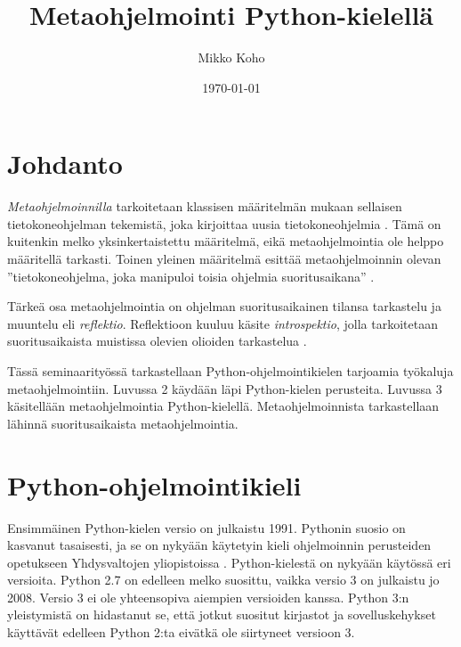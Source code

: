 \documentclass[finnish]{tktltiki2}
\title{Metaohjelmointi Python-kielellä}
\author{Mikko Koho}
\date{\today}
\theoremstyle{definition}
\theoremstyle{remark}
\begin{document}
    

\frontmatter      %

\maketitle        %

\makeabstract     %

\tableofcontents  %


\mainmatter       %


\section{Johdanto}

\emph{Metaohjelmoinnilla} tarkoitetaan klassisen määritelmän mukaan sellaisen tietokoneohjelman tekemistä, joka kirjoittaa uusia tietokoneohjelmia \cite[s. 6]{hazzard2013}. Tämä on kuitenkin melko yksinkertaistettu määritelmä, eikä metaohjelmointia ole helppo määritellä tarkasti. Toinen yleinen määritelmä esittää metaohjelmoinnin olevan ''tietokoneohjelma, joka manipuloi toisia ohjelmia suoritusaikana'' \cite[s. 7]{hazzard2013}. 

Tärkeä osa metaohjelmointia on ohjelman suoritusaikainen tilansa tarkastelu ja muuntelu eli \emph{reflektio}. Reflektioon kuuluu käsite \emph{introspektio}, jolla tarkoitetaan suoritusaikaista muistissa olevien olioiden tarkastelua \cite{dive-into-python}.

Tässä seminaarityössä tarkastellaan Python-ohjelmointikielen tarjoamia työkaluja metaohjelmointiin. Luvussa 2 käydään läpi Python-kielen perusteita. Luvussa 3 käsitellään metaohjelmointia Python-kielellä. Metaohjelmoinnista tarkastellaan lähinnä suoritusaikaista metaohjelmointia. 



\section{Python-ohjelmointikieli}

Ensimmäinen Python-kielen versio on julkaistu 1991. Pythonin suosio on kasvanut tasaisesti, ja se on nykyään käytetyin kieli ohjelmoinnin perusteiden opetukseen Yhdysvaltojen yliopistoissa \cite{python-teaching}. Python-kielestä on nykyään käytössä eri versioita. Python 2.7 on edelleen melko suosittu, vaikka versio 3 on julkaistu jo 2008. Versio 3 ei ole yhteensopiva aiempien versioiden kanssa. Python 3:n yleistymistä on hidastanut se, että jotkut suositut kirjastot ja sovelluskehykset käyttävät edelleen Python 2:ta eivätkä ole siirtyneet versioon 3.
\end{document}
